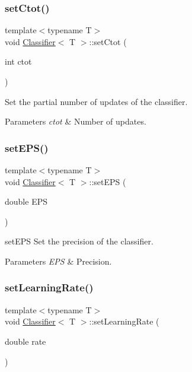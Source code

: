 \subsubsection{\texorpdfstring{set\+Ctot()}{setCtot()}}
{\footnotesize\ttfamily template$<$typename T$>$ \\
void \hyperlink{class_classifier}{Classifier}$<$ T $>$\+::set\+Ctot (\begin{DoxyParamCaption}\item[{int}]{ctot }\end{DoxyParamCaption})\hspace{0.3cm}{\ttfamily [inline]}}



Set the partial number of updates of the classifier. 


\begin{DoxyParams}{Parameters}
{\em ctot} & Number of updates. \\
\hline
\end{DoxyParams}
\mbox{\label{class_classifier_a47b520ded0313a3cdcab8691cdd28257}} 
\subsubsection{\texorpdfstring{set\+E\+P\+S()}{setEPS()}}
{\footnotesize\ttfamily template$<$typename T$>$ \\
void \hyperlink{class_classifier}{Classifier}$<$ T $>$\+::set\+E\+PS (\begin{DoxyParamCaption}\item[{double}]{E\+PS }\end{DoxyParamCaption})\hspace{0.3cm}{\ttfamily [inline]}}



set\+E\+PS Set the precision of the classifier. 


\begin{DoxyParams}{Parameters}
{\em E\+PS} & Precision. \\
\hline
\end{DoxyParams}
\mbox{\label{class_classifier_ae705171568ea2066b619609af614129e}} 
\subsubsection{\texorpdfstring{set\+Learning\+Rate()}{setLearningRate()}}
{\footnotesize\ttfamily template$<$typename T$>$ \\
void \hyperlink{class_classifier}{Classifier}$<$ T $>$\+::set\+Learning\+Rate (\begin{DoxyParamCaption}\item[{double}]{rate }\end{DoxyParamCaption})\hspace{0.3cm}{\ttfamily [inline]}}



